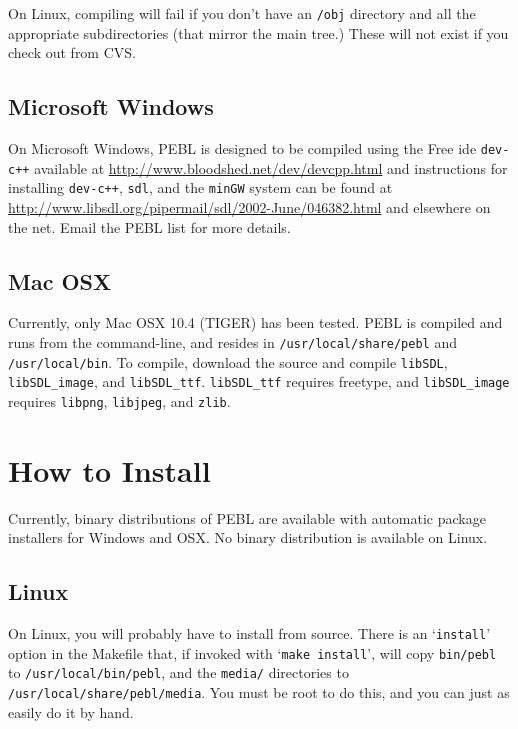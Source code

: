 On Linux, compiling will fail if you don't have an \texttt{/obj}
directory and all the appropriate subdirectories (that mirror the main
tree.)  These will not exist if you check out from CVS.

\subsection{Microsoft Windows}

On Microsoft Windows, PEBL is designed to be compiled using the Free
ide \texttt{dev-c++} available at
\href{http://www.bloodshed.net/dev/devcpp.html}{http://www.bloodshed.net/dev/devcpp.html}
and instructions for installing \texttt{dev-c++}, \texttt{sdl}, and
the \texttt{minGW} system can be found at
\href{http://www.libsdl.org/pipermail/sdl/2002-June/046382.html}{http://www.libsdl.org/pipermail/sdl/2002-June/046382.html}
and elsewhere on the net.  Email the PEBL list for more details.

\subsection{Mac OSX}

Currently, only Mac OSX 10.4 (TIGER) has been tested. PEBL is compiled
and runs from the command-line, and resides in
\texttt{/usr/local/share/pebl} and \texttt{/usr/local/bin}.  To
compile, download the source and compile \texttt{libSDL},
\texttt{libSDL\_image}, and \texttt{libSDL\_ttf}.
\texttt{libSDL\_ttf} requires freetype, and \texttt{libSDL\_image}
requires \texttt{libpng}, \texttt{libjpeg}, and \texttt{zlib}.

\section{How to Install}

Currently, binary distributions of PEBL are available with automatic
package installers for Windows and OSX.  No binary distribution is
available on Linux.

\subsection{Linux}

On Linux, you will probably have to install from source.
There is an `\texttt{install}' option in the Makefile that, if invoked with
`\texttt{make install}', will copy \texttt{bin/pebl} to \texttt{/usr/local/bin/pebl}, and the
\texttt{media/} directories to \texttt{/usr/local/share/pebl/media}.  You must be root
to do this, and you can just as easily do it by hand.

